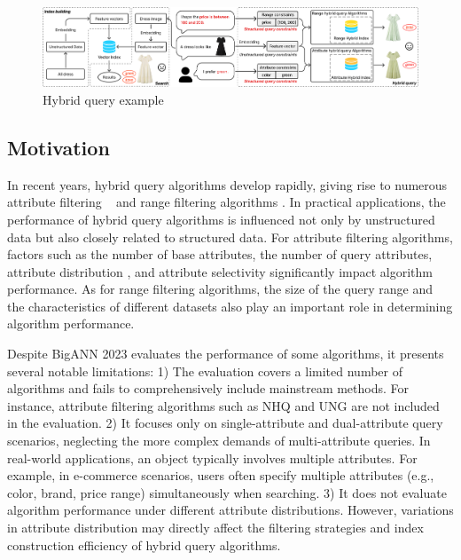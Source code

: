 \documentclass[sigconf, nonacm]{acmart}
\begin{document}
	\begin{figure}
		\centering
		\setlength{\abovecaptionskip}{0.1cm}
		\setlength{\belowcaptionskip}{-0.2cm}
		\includegraphics[width=\textwidth]{figures/hybrid ANNS.pdf}
		\caption{Hybrid query example}
		
		\label{fig:hybrid ANNS}
	\end{figure}
	\subsection{Motivation}
	
	In recent years, hybrid query algorithms develop rapidly, giving rise to numerous attribute filtering ~\cite{NHQ,diskann} and range filtering algorithms \cite{serf,iRangeGraph}. In practical applications, the performance of hybrid query algorithms is influenced not only by unstructured data but also closely related to structured data. For attribute filtering algorithms, factors such as the number of base attributes, the number of query attributes, attribute distribution \cite{UNG}, and attribute selectivity \cite{ACORN} significantly impact algorithm performance. As for range filtering algorithms, the size of the query range and the characteristics of different datasets also play an important role in determining algorithm performance.
	
	Despite BigANN 2023 \cite{bigann2023} evaluates the performance of some algorithms, it presents several notable limitations:
	1) The evaluation covers a limited number of algorithms and fails to comprehensively include mainstream methods. For instance, attribute filtering algorithms such as NHQ and UNG are not included in the evaluation. 2) It focuses only on single-attribute and dual-attribute query scenarios, neglecting the more complex demands of multi-attribute queries. In real-world applications, an object typically involves multiple attributes. For example, in e-commerce scenarios, users often specify multiple attributes (e.g., color, brand, price range) simultaneously when searching.
	3) It does not evaluate algorithm performance under different attribute distributions. However, variations in attribute distribution may directly affect the filtering strategies and index construction efficiency of hybrid query algorithms.
	
\end{document}
